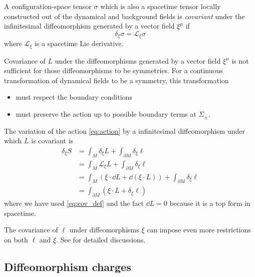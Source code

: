 \documentclass[10pt]{article}
\begin{document}
\begin{definition}[Covariance]
    A configuration-space tensor $\sigma$ which is also a spacetime tensor locally constructed out of the dynamical and background fields is \textit{covariant} under the infinitesimal diffeomorphism generated by a vector field $\xi^\mu$ if
    \begin{equation}
        \delta_{\xi}\sigma=\mathcal{L}_\xi \sigma\label{eq:cov_def}
    \end{equation}
    where $\mathcal{L}_\xi$ is a spacetime Lie derivative.
\end{definition}

Covariance of $L$ under the diffeomorphisms generated by a vector field $\xi^\mu$ is not sufficient for those diffeomorphisms to be symmetries.
For a continuous transformation of dynamical fields to be a symmetry, this transformation
\begin{itemize}
    \item must respect the boundary conditions
    \item must preserve the action up to possible boundary terms at $\Sigma_\pm$.
\end{itemize}
The variation of the action \cref{eq:action} by a infinitesimal diffeomorphism under which $L$ is covariant is
\begin{equation}
    \begin{split}
        \delta_\xi S&=\int_M \delta_\xi L+\int_{\partial M}\delta_\xi \ell\\
        &=\int_M \mathcal{L}_\xi L+\int_{\partial M}\delta_\xi \ell\\
        &=\int_M \left(\xi\cdot\dd{L}+\dd(\xi\cdot L)\right)+\int_{\partial M}\delta_\xi \ell\\
        &=\int_{\partial M}\left(\xi\cdot L+\delta_{\xi}\ell\right)
    \end{split}
\end{equation}
where we have used \cref{eq:cov_def} and the fact $\dd{L}=0$ because it is a top form in spacetime.

\begin{remark}
    The covariance of $\ell$ under diffeomorphisms $\xi$ can impose even more restrictions on both $\ell$ and $\xi$.
    See \cite{Harlow:2019yfa} for detailed discussions.
\end{remark}

\subsection{Diffeomorphism charges}
\end{document}

